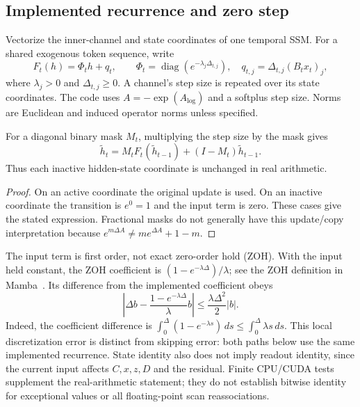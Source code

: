 \subsection{Implemented recurrence and zero step}
Vectorize the inner-channel and state coordinates of one temporal SSM.
For a shared exogenous token sequence, write
\begin{equation}\label{eq:recurrence}
 F_t(h)=\Phi_t h+q_t,\qquad
 \Phi_t=\operatorname{diag}(e^{-\lambda_j\Delta_{t,j}}),\quad
 q_{t,j}=\Delta_{t,j}(B_tx_t)_j,
\end{equation}
where $\lambda_j>0$ and $\Delta_{t,j}\ge0$. A channel's step size is repeated
over its state coordinates. The code uses $A=-\exp(A_{\log})$ and a softplus
step size. Norms are Euclidean and induced operator norms unless specified.

\begin{Proposition}\label{prop:identity}
For a diagonal binary mask $M_t$, multiplying the step size by the mask gives
\begin{equation}\label{eq:gate}
 \widetilde h_t=M_tF_t(\widetilde h_{t-1})+(I-M_t)\widetilde h_{t-1}.
\end{equation}
Thus each inactive hidden-state coordinate is unchanged in real arithmetic.
\end{Proposition}
\begin{proof}
On an active coordinate the original update is used. On an inactive coordinate
the transition is $e^0=1$ and the input term is zero. These cases give the
stated expression. Fractional masks do not generally have this update/copy
interpretation because $e^{m\Delta A}\ne m e^{\Delta A}+1-m$.
\end{proof}

The input term is first order, not exact zero-order hold (ZOH). With the input
held constant, the ZOH coefficient is $(1-e^{-\lambda\Delta})/\lambda$;
see the ZOH definition in Mamba~\cite{gu2024}. Its difference from the
implemented coefficient obeys
\begin{equation}\label{eq:zoh}
 \left|\Delta b-\frac{1-e^{-\lambda\Delta}}{\lambda}b\right|
 \le \frac{\lambda\Delta^2}{2}|b|.
\end{equation}
Indeed, the coefficient difference is
$\int_0^\Delta(1-e^{-\lambda s})\,ds\le\int_0^\Delta\lambda s\,ds$.
This local discretization error is distinct from skipping error: both paths
below use the same implemented recurrence. State identity also does not imply
readout identity, since the current input affects $C,x,z,D$ and the residual.
Finite CPU/CUDA tests supplement the real-arithmetic statement; they do not
establish bitwise identity for exceptional values or all floating-point scan
reassociations.

